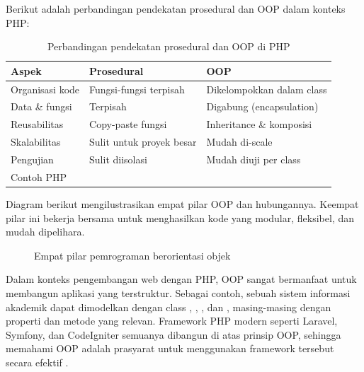 Berikut adalah perbandingan pendekatan prosedural dan OOP dalam konteks PHP:

\begin{table}[ht]
\centering
\begin{tabular}{|P{3cm}|P{5cm}|P{5cm}|}
\hline
\textbf{Aspek} & \textbf{Prosedural} & \textbf{OOP} \\
\hline
Organisasi kode & Fungsi-fungsi terpisah & Dikelompokkan dalam class \\
\hline
Data \& fungsi & Terpisah & Digabung (encapsulation) \\
\hline
Reusabilitas & Copy-paste fungsi & Inheritance \& komposisi \\
\hline
Skalabilitas & Sulit untuk proyek besar & Mudah di-scale \\
\hline
Pengujian & Sulit diisolasi & Mudah diuji per class \\
\hline
Contoh PHP &  &  \\
\hline
\end{tabular}
\caption{Perbandingan pendekatan prosedural dan OOP di PHP}
\end{table}

Diagram berikut mengilustrasikan empat pilar OOP dan hubungannya. Keempat pilar ini bekerja bersama untuk menghasilkan kode yang modular, fleksibel, dan mudah dipelihara.

\begin{figure}[ht]
\centering
{}
\caption{Empat pilar pemrograman berorientasi objek}
\end{figure}

Dalam konteks pengembangan web dengan PHP, OOP sangat bermanfaat untuk membangun aplikasi yang terstruktur. Sebagai contoh, sebuah sistem informasi akademik dapat dimodelkan dengan class , , , dan , masing-masing dengan properti dan metode yang relevan. Framework PHP modern seperti Laravel, Symfony, dan CodeIgniter semuanya dibangun di atas prinsip OOP, sehingga memahami OOP adalah prasyarat untuk menggunakan framework tersebut secara efektif \cite{phpRightWay}.

